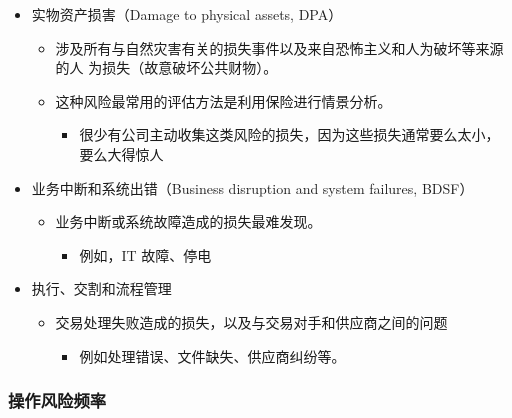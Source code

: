 \begin{itemize}
\begin{itemize}
\begin{itemize}
        \item 投诉（complaints）
        \item 产品规格等错误招致的折扣贬损
        \end{itemize}
    \end{itemize}
\item 实物资产损害（Damage to physical assets, DPA）
    \begin{itemize}
    \item 涉及所有与自然灾害有关的损失事件以及来自恐怖主义和人为破坏等来源的人 为损失（故意破坏公共财物）。
    \item 这种风险最常用的评估方法是利用保险进行情景分析。
        \begin{itemize}
        \item 很少有公司主动收集这类风险的损失，因为这些损失通常要么太小，要么大得惊人
        \end{itemize}
    \end{itemize}
\item 业务中断和系统出错（Business disruption and system failures, BDSF）
    \begin{itemize}
    \item 业务中断或系统故障造成的损失最难发现。
        \begin{itemize}
        \item 例如，IT 故障、停电
        \end{itemize}
    \end{itemize}
\item 执行、交割和流程管理
    \begin{itemize}
    \item 交易处理失败造成的损失，以及与交易对手和供应商之间的问题
        \begin{itemize}
        \item 例如处理错误、文件缺失、供应商纠纷等。
        \end{itemize}
    \end{itemize}
\end{itemize}



\subsubsection{操作风险频率}


